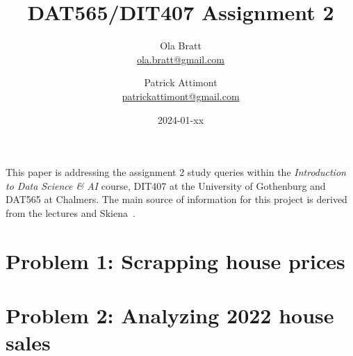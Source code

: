 \documentclass[a4paper]{article}
\begin{document}
\author{Ola Bratt \\
  \href{mailto:ola.bratt@gmail.com}{ola.bratt@gmail.com}
  \and
  Patrick Attimont \\
  \href{patrickattimont@gmail.com}{patrickattimont@gmail.com}
}

\title{DAT565/DIT407 Assignment 2}
\date{2024-01-xx}

\maketitle

This paper is addressing the assignment 2 study queries within the \emph{Introduction to Data Science \& AI} course, DIT407 at 
the University of Gothenburg and DAT565 at Chalmers. The main source of information for this project
is derived from the lectures and Skiena~\cite{Skiena:2024}. 
\section*{Problem 1: Scrapping house prices}

\section*{Problem 2: Analyzing 2022 house sales}
\end{document}
